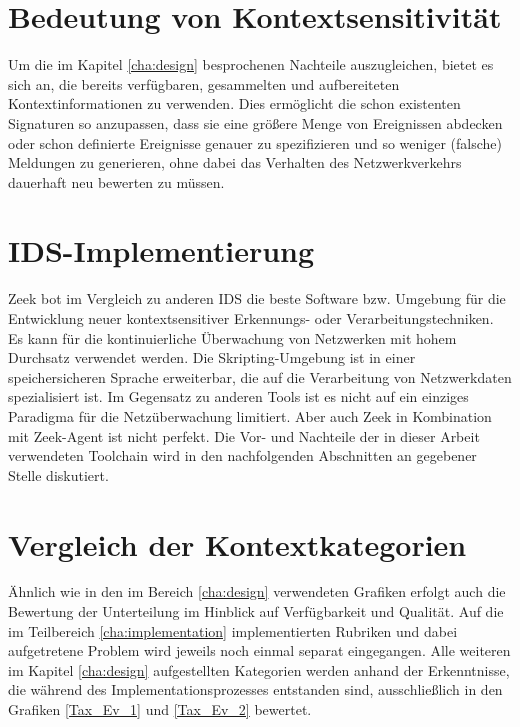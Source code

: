 \section{Bedeutung von Kontextsensitivität}
Um die im Kapitel \ref{cha:design} besprochenen Nachteile auszugleichen, bietet es sich an, die bereits verfügbaren, gesammelten und aufbereiteten Kontextinformationen zu verwenden. Dies ermöglicht die schon existenten Signaturen so anzupassen, dass sie eine größere Menge von Ereignissen abdecken oder schon definierte Ereignisse genauer zu spezifizieren und so weniger (falsche) Meldungen zu generieren, ohne dabei das Verhalten des Netzwerkverkehrs dauerhaft neu bewerten zu müssen.
\section{IDS-Implementierung}
Zeek bot im Vergleich zu anderen IDS die beste Software bzw. Umgebung für die Entwicklung neuer kontextsensitiver Erkennungs- oder Verarbeitungstechniken. Es kann für die kontinuierliche Überwachung von Netzwerken mit hohem Durchsatz verwendet werden. Die Skripting-Umgebung ist in einer speichersicheren Sprache erweiterbar, die auf die Verarbeitung von Netzwerkdaten spezialisiert ist. Im Gegensatz zu anderen Tools ist es nicht auf ein einziges Paradigma für die Netzüberwachung limitiert.
Aber auch Zeek in Kombination mit Zeek-Agent ist nicht perfekt. Die Vor- und Nachteile der in dieser Arbeit verwendeten Toolchain wird in den nachfolgenden Abschnitten an gegebener Stelle diskutiert.
\section{Vergleich der Kontextkategorien} 
Ähnlich wie in den im Bereich \ref{cha:design} verwendeten Grafiken erfolgt auch die Bewertung der Unterteilung im Hinblick auf Verfügbarkeit und Qualität. Auf die im Teilbereich \ref{cha:implementation} implementierten Rubriken und dabei aufgetretene Problem wird jeweils noch einmal separat eingegangen. Alle weiteren im Kapitel \ref{cha:design} aufgestellten Kategorien werden anhand der Erkenntnisse, die während des Implementationsprozesses entstanden sind, ausschließlich in den Grafiken \ref{Tax_Ev_1} und \ref{Tax_Ev_2} bewertet.

